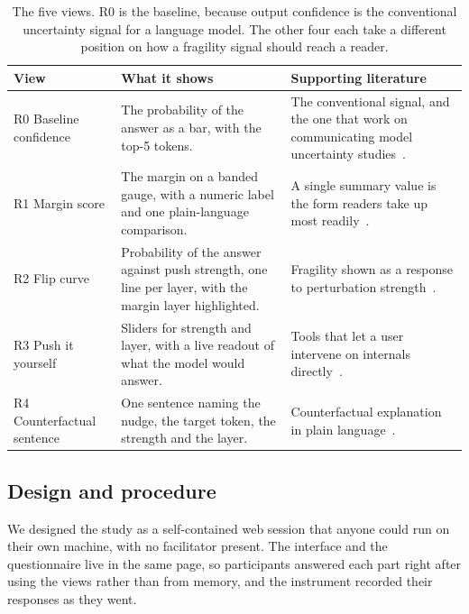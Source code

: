 \documentclass[sigconf]{acmart}
\begin{document}
\begin{table}[t]
  \caption{The five views. R0 is the baseline, because output confidence is the conventional uncertainty signal
  for a language model. The other four each take a different position on how a fragility signal should reach
  a reader.}
  \label{tab:views}
  \small
  \begin{tabular}{@{}p{} p{} p{}@{}}
    \toprule
    \textbf{View} & \textbf{What it shows} & \textbf{Supporting literature} \\
    \midrule
    R0 Baseline confidence &
      The probability of the answer as a bar, with the top-5 tokens. &
      The conventional signal, and the one that work on communicating model uncertainty
      studies~\citep{kimImNotSure2024, boRelyNotRely2024}. \\
    R1 Margin score &
      The margin on a banded gauge, with a numeric label and one plain-language comparison. &
      A single summary value is the form readers take up most
      readily~\citep{kayWhenIshMy2016, correllValueSuppressingUncertaintyPalettes2018}. \\
    R2 Flip curve &
      Probability of the answer against push strength, one line per layer, with the margin layer highlighted. &
      Fragility shown as a response to perturbation
      strength~\citep{dasBluffInteractivelyDeciphering2020, youPandaNotPanda2023,
      stoehrActivationScalingSteering2024}. \\
    R3 Push it yourself &
      Sliders for strength and layer, with a live readout of what the model would answer. &
      Tools that let a user intervene on internals
      directly~\citep{gevaLMDebuggerInteractiveTool2022, wangHypperSteerHypotheticalSteering2020}. \\
    R4 Counterfactual sentence &
      One sentence naming the nudge, the target token, the strength and the layer. &
      Counterfactual explanation in plain
      language~\citep{chengDECEDecisionExplorer2020, wangGAMCoachInteractive2023, kuhlLetsGoAlien2023}. \\
    \bottomrule
  \end{tabular}
\end{table}

\subsection{Design and procedure}

We designed the study as a self-contained web session that anyone could run on their own machine, with no
facilitator present. The interface and the questionnaire live in the same page, so participants answered each
part right after using the views rather than from memory, and the instrument recorded their responses as they
went.
\end{document}

